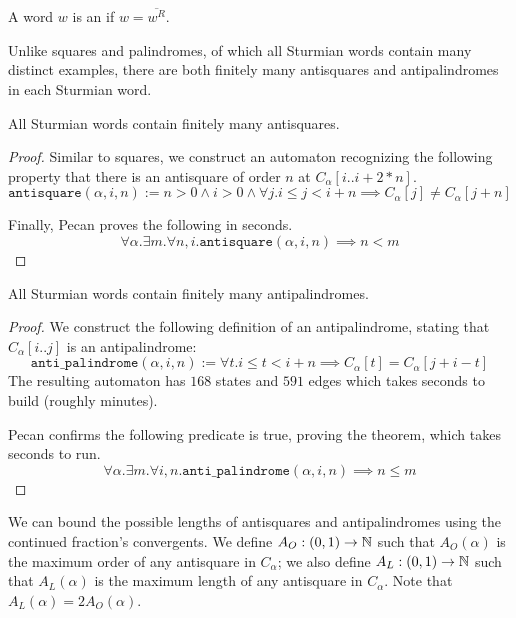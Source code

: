 \begin{definition}
    A word $w$ is an  if $w = \overline{w^R}$.
\end{definition}

Unlike squares and palindromes, of which all Sturmian words contain many distinct examples, there are both finitely many antisquares and antipalindromes in each Sturmian word.

\begin{theorem}
    All Sturmian words contain finitely many antisquares.
\end{theorem}
\begin{proof}
Similar to squares, we construct an automaton recognizing the following property that there is an antisquare of order $n$ at $C_{\alpha}[i..i+2*n]$.
\[
    \texttt{antisquare}(\alpha, i, n) := n > 0 \land i > 0 \land \forall j. i \leq j < i + n \implies C_{\alpha}[j] \ne C_{\alpha}[j + n]
\]

Finally, Pecan proves the following in  seconds.
\[
    \forall \alpha. \exists m. \forall n, i. \texttt{antisquare}(\alpha, i, n) \implies n < m
\]
\end{proof}

\begin{theorem}
    All Sturmian words contain finitely many antipalindromes.
\end{theorem}
\begin{proof}
    We construct the following definition of an antipalindrome, stating that $C_{\alpha}[i..j]$ is an antipalindrome:
    \[
        \texttt{anti\_palindrome}(\alpha, i, n) := 
            \forall t. i \leq t < i + n \implies C_{\alpha}[t] = C_{\alpha}[j + i - t]
    \]
    The resulting automaton has $168$ states and $591$ edges which takes  seconds to build (roughly  minutes).
    
    Pecan confirms the following predicate is true, proving the theorem, which takes  seconds to run.
    \[
        \forall \alpha. \exists m. \forall i, n. \texttt{anti\_palindrome}(\alpha, i, n) \implies n \leq m
    \]
\end{proof}

We can bound the possible lengths of antisquares and antipalindromes using the continued fraction's convergents.
We define $A_O : (0,1) \to \mathbb{N}$ such that $A_O(\alpha)$ is the maximum order of any antisquare in $C_{\alpha}$; we also define $A_L : (0,1) \to \mathbb{N}$ such that $A_L(\alpha)$ is the maximum length of any antisquare in $C_{\alpha}$.
Note that $A_L(\alpha) = 2A_O(\alpha)$.

